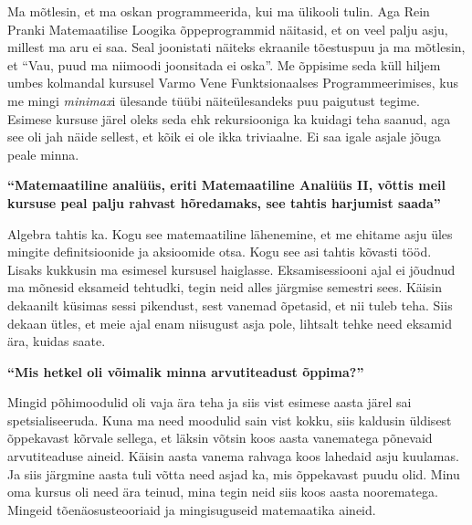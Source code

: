 Ma mõtlesin, et ma oskan programmeerida, kui ma ülikooli tulin. Aga Rein Pranki Matemaatilise Loogika õppeprogrammid näitasid, et on veel palju asju, millest ma aru ei saa. Seal joonistati näiteks ekraanile tõestuspuu ja ma mõtlesin, et \enquote{Vau, puud ma niimoodi joonsitada ei oska}. Me õppisime seda küll hiljem umbes kolmandal kursusel Varmo Vene Funktsionaalses Programmeerimises, kus me mingi \emph{minimax}i ülesande tüübi näiteülesandeks puu paigutust tegime. Esimese kursuse järel oleks seda ehk rekursiooniga ka kuidagi teha saanud, aga see oli jah näide sellest, et kõik ei ole ikka triviaalne. Ei saa igale asjale jõuga peale minna. 

\textbf{\enquote{Matemaatiline analüüs, eriti Matemaatiline Analüüs II, võttis meil kursuse peal palju rahvast hõredamaks, see tahtis harjumist saada}}

Algebra tahtis ka. Kogu see matemaatiline lähenemine, et me ehitame asju üles mingite definitsioonide ja aksioomide otsa. Kogu see asi tahtis kõvasti tööd. Lisaks kukkusin ma esimesel kursusel haiglasse. Eksamisessiooni ajal ei jõudnud ma mõnesid eksameid tehtudki, tegin neid alles järgmise semestri sees. Käisin dekaanilt küsimas sessi pikendust, sest vanemad õpetasid, et nii tuleb teha. Siis dekaan ütles, et meie ajal enam niisugust asja pole, lihtsalt tehke need eksamid ära, kuidas saate. 

\textbf{\enquote{Mis hetkel oli võimalik minna arvutiteadust õppima?}} 

Mingid põhimoodulid oli vaja ära teha ja siis vist esimese aasta järel sai spetsialiseeruda. Kuna ma need moodulid sain vist kokku, siis  kaldusin üldisest õppekavast kõrvale sellega, et läksin võtsin koos aasta vanematega põnevaid arvutiteaduse aineid. Käisin aasta vanema rahvaga koos lahedaid asju kuulamas. Ja siis järgmine aasta tuli  võtta need asjad ka, mis õppekavast puudu olid. Minu oma kursus oli need ära teinud, mina tegin neid siis koos aasta noorematega. Mingeid tõenäosusteooriaid ja mingisuguseid matemaatika aineid. 

